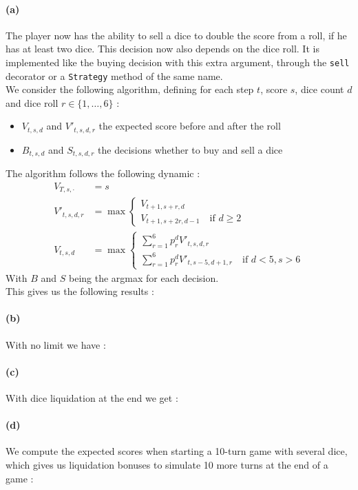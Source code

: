 \documentclass{article}
\newcommand{\dice}{\{1,\dots,6\}}
\newcommand{\getoutput}[1]{}
\begin{document}
    \paragraph{(a)}
    The player now has the ability to sell a dice to double the score from a roll,
    if he has at least two dice. This decision now also depends on the dice roll.
    It is implemented like the buying decision with this extra argument,
    through the \texttt{sell} decorator or a \texttt{Strategy} method of the same name.\\
    We consider the following algorithm, defining for each step $t$, score $s$, dice count $d$
    and dice roll $r\in\dice$ :
    \begin{itemize}
        \item $V_{t,s,d}$ and $V'_{t,s,d,r}$ the expected score before and after the roll
        \item $B_{t,s,d}$ and $S_{t,s,d,r}$ the decisions whether to buy and sell a dice
    \end{itemize}
    The algorithm follows the following dynamic :
    \begin{align}
        V_{T,s,\cdot} &= s\\
        V'_{t,s,d,r} &= \max
        \begin{cases}
            V_{t+1,s+r,d}\\
            V_{t+1,s+2r,d-1}\quad\text{if }d\geq2
        \end{cases}\\
        V_{t,s,d} &= \max
        \begin{cases}
            \sum_{r=1}^6p^d_rV'_{t,s,d,r}\\
            \sum_{r=1}^6p^d_rV'_{t,s-5,d+1,r}\quad\text{if }d<5,s > 6
        \end{cases}
    \end{align}
    With $B$ and $S$ being the argmax for each decision.\\
    This gives us the following results :
    \getoutput{2a}

    \paragraph{(b)}
    With no limit we have :
    \getoutput{2b}

    \paragraph{(c)}
    With dice liquidation at the end we get :
    \getoutput{2c}

    \paragraph{(d)}
    We compute the expected scores when starting a 10-turn game with several dice,
    which gives us liquidation bonuses to simulate 10 more turns at the end of a game :
    \getoutput{2d}
\end{document}
